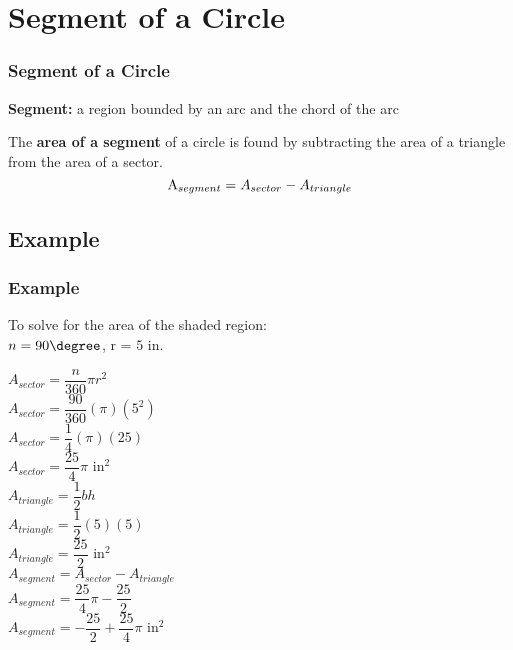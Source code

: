 \documentclass{beamer}
\begin{document}
\section{Segment of a Circle} 
\begin{frame} 
\frametitle{Segment of a Circle} 
\textbf{Segment:} a region bounded by an arc and the chord of the arc

\vspce 

The \textbf{area of a segment} of a circle is found by subtracting the area of a triangle from the area of a sector. 
\[
\text A_{segment} = A_{sector}-A_{triangle}
\] 
\begin{center}
 
\end{center} 
\end{frame}

\begin{frame} 
\subsection{Example}
\frametitle{Example} 
\vspace*{-3cm}
To solve for the area of the shaded region: \\
$n=90 \degree $, 
$\text{r = 5 in.}$\\
\begin{multicols}{3}
\small{$A_{sector} = \dfrac{n}{360}\pi r^2$\\
$A_{sector} = \dfrac{90}{360}(\pi)(5^2)$\\
$A_{sector} = \dfrac{1}{4}(\pi)(25)$\\
$A_{sector}=\dfrac{25}{4}\pi$ in$^2$\\
\columnbreak
$A_{triangle}=\dfrac{1}{2}bh$\\
$A_{triangle}=\dfrac{1}{2}(5)(5)$\\
$A_{triangle}=\dfrac{25}{2}$ in$^2$\\
\columnbreak
\tiny $A_{segment} = A_{sector}-A_{triangle}$\\
$A_{segment} = \dfrac{25}{4}\pi-\dfrac{25}{2}$\\
$A_{segment} = -\dfrac{25}{2}+\dfrac{25}{4}\pi$ in$^2$}
\end{multicols} 

\vspace*{-4.6cm}\hspace*{8.5cm}
 

\end{frame}
\end{document}
